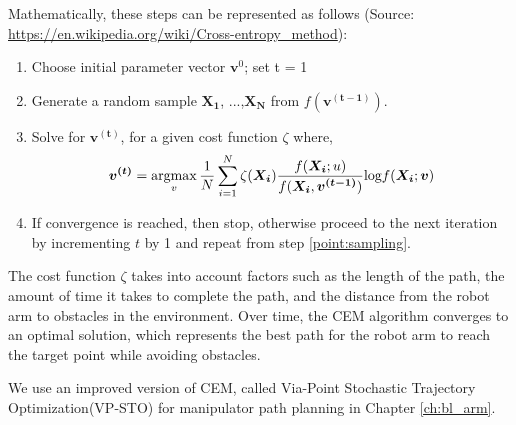 Mathematically, these steps can be represented as follows (Source: \url{https://en.wikipedia.org/wiki/Cross-entropy_method}):

\begin{enumerate}
    \item Choose initial parameter vector $\boldsymbol{v}^{0}$; set t = 1
    \item \label{point:sampling}Generate a random sample $\boldsymbol{X_1}$, ...,$\boldsymbol{X_N}$ from $f(\boldsymbol{v^{(t-1)}})$.
    \item Solve for $\boldsymbol{v^{(t)}}$, for a given cost function $\zeta$ where,
    \begin{equation}
        \boldsymbol{v^{(t)}} = \operatorname*{argmax}_v\frac{1}{N}\sum_{i=1}^{N}\zeta(\boldsymbol{X_i})\frac{f(\boldsymbol{X_i};u)}{f(\boldsymbol{X_i},\boldsymbol{v^{(t-1)}})}\text{log}f(\boldsymbol{X_i};\boldsymbol{v})
    \end{equation}
    \item If convergence is reached, then stop, otherwise proceed to the next iteration by incrementing $t$ by 1 and repeat from step \ref{point:sampling}.
\end{enumerate}

The cost function $\zeta$ takes into account factors such as the length of the path, the amount of time it takes to complete the path, and the distance from the robot arm to obstacles in the environment. Over time, the CEM algorithm converges to an optimal solution, which represents the best path for the robot arm to reach the target point while avoiding obstacles. 

We use an improved version of CEM, called Via-Point Stochastic Trajectory Optimization(VP-STO)\cite{VP-STO} for manipulator path planning in Chapter \ref{ch:bl_arm}.
